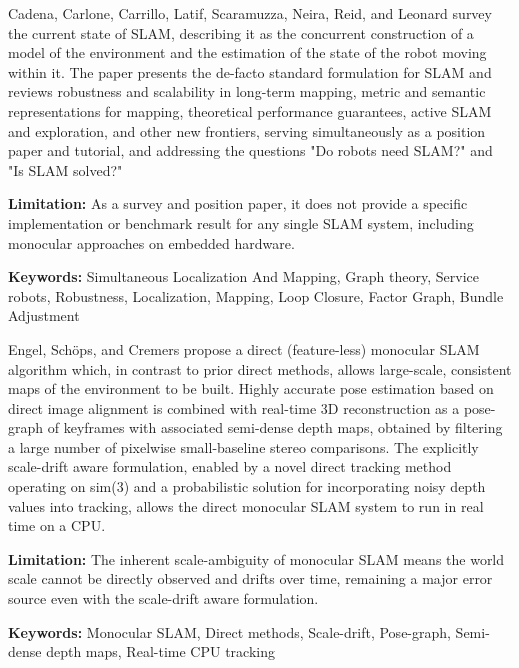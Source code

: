 {
	Cadena, Carlone, Carrillo, Latif, Scaramuzza, Neira, Reid, and Leonard \cite{Cadena:2016} survey the current state of SLAM, describing it as the concurrent construction of a model of the environment and the estimation of the state of the robot moving within it. The paper presents the de-facto standard formulation for SLAM and reviews robustness and scalability in long-term mapping, metric and semantic representations for mapping, theoretical performance guarantees, active SLAM and exploration, and other new frontiers, serving simultaneously as a position paper and tutorial, and addressing the questions "Do robots need SLAM?" and "Is SLAM solved?"
	
	\bigskip
	\textbf{Limitation:} As a survey and position paper, it does not provide a specific implementation or benchmark result for any single SLAM system, including monocular approaches on embedded hardware.
	
	\scriptsize{\textbf{Keywords:} Simultaneous Localization And Mapping, Graph theory, Service robots, Robustness, Localization, Mapping, Loop Closure, Factor Graph, Bundle Adjustment}
}

{
	Engel, Schöps, and Cremers \cite{Engel:2014} propose a direct (feature-less) monocular SLAM algorithm which, in contrast to prior direct methods, allows large-scale, consistent maps of the environment to be built. Highly accurate pose estimation based on direct image alignment is combined with real-time 3D reconstruction as a pose-graph of keyframes with associated semi-dense depth maps, obtained by filtering a large number of pixelwise small-baseline stereo comparisons. The explicitly scale-drift aware formulation, enabled by a novel direct tracking method operating on sim(3) and a probabilistic solution for incorporating noisy depth values into tracking, allows the direct monocular SLAM system to run in real time on a CPU.
	
	\bigskip
	\textbf{Limitation:} The inherent scale-ambiguity of monocular SLAM means the world scale cannot be directly observed and drifts over time, remaining a major error source even with the scale-drift aware formulation.
	
	\scriptsize{\textbf{Keywords:} Monocular SLAM, Direct methods, Scale-drift, Pose-graph, Semi-dense depth maps, Real-time CPU tracking}
}

